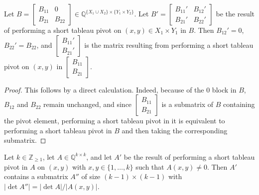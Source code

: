 \begin{lemma}
    \label{lem:stp_block_zero}
    \leanok
    Let $B = \begin{bmatrix} B_{11} & 0 \\ B_{21} & B_{22} \end{bmatrix} \in \mathbb{Q}^{\{X_{1} \cup X_{2}\} \times \{Y_{1} \times Y_{2}\}}$. Let $B' = \begin{bmatrix} B_{11}' & B_{12}' \\ B_{21}' & B_{22}' \end{bmatrix}$ be the result of performing a short tableau pivot on $(x, y) \in X_{1} \times Y_{1}$ in $B$. Then $B_{12}' = 0$, $B_{22}' = B_{22}$, and $\begin{bmatrix} B_{11}' \\ B_{21}' \end{bmatrix}$ is the matrix resulting from performing a short tableau pivot on $(x, y)$ in $\begin{bmatrix} B_{11} \\ B_{21} \end{bmatrix}$.
\end{lemma}

\begin{proof}
    \leanok
    This follows by a direct calculation. Indeed, because of the $0$ block in $B$, $B_{12}$ and $B_{22}$ remain unchanged, and since $\begin{bmatrix} B_{11} \\ B_{21} \end{bmatrix}$ is a submatrix of $B$ containing the pivot element, performing a short tableau pivot in it is equivalent to performing a short tableau pivot in $B$ and then taking the corresponding submatrix.
\end{proof}

\begin{lemma}
    \label{lem:stp_nz_abs_det_eq}
    \leanok
    Let $k \in \mathbb{Z}_{\geq 1}$, let $A \in \mathbb{Q}^{k \times k}$, and let $A'$ be the result of performing a short tableau pivot in $A$ on $(x, y)$ with $x, y \in \{1, \dots, k\}$ such that $A (x, y) \neq 0$. Then $A'$ contains a submatrix $A''$ of size $(k - 1) \times (k - 1)$ with $|\det A''| = |\det A| / |A (x, y)|$.
\end{lemma}

